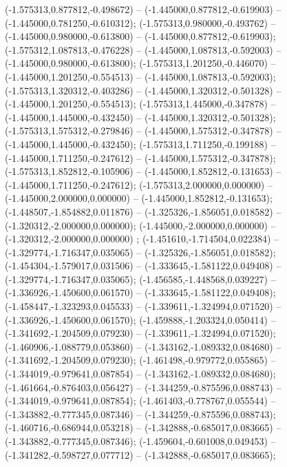  (-1.575313,0.877812,-0.498672) -- (-1.445000,0.877812,-0.619903) -- (-1.445000,0.781250,-0.610312);
 (-1.575313,0.980000,-0.493762) -- (-1.445000,0.980000,-0.613800) -- (-1.445000,0.877812,-0.619903);
 (-1.575312,1.087813,-0.476228) -- (-1.445000,1.087813,-0.592003) -- (-1.445000,0.980000,-0.613800);
 (-1.575313,1.201250,-0.446070) -- (-1.445000,1.201250,-0.554513) -- (-1.445000,1.087813,-0.592003);
 (-1.575313,1.320312,-0.403286) -- (-1.445000,1.320312,-0.501328) -- (-1.445000,1.201250,-0.554513);
 (-1.575313,1.445000,-0.347878) -- (-1.445000,1.445000,-0.432450) -- (-1.445000,1.320312,-0.501328);
 (-1.575313,1.575312,-0.279846) -- (-1.445000,1.575312,-0.347878) -- (-1.445000,1.445000,-0.432450);
 (-1.575313,1.711250,-0.199188) -- (-1.445000,1.711250,-0.247612) -- (-1.445000,1.575312,-0.347878);
 (-1.575313,1.852812,-0.105906) -- (-1.445000,1.852812,-0.131653) -- (-1.445000,1.711250,-0.247612);
 (-1.575313,2.000000,0.000000) -- (-1.445000,2.000000,0.000000) -- (-1.445000,1.852812,-0.131653);
 (-1.448507,-1.854882,0.011876) -- (-1.325326,-1.856051,0.018582) -- (-1.320312,-2.000000,0.000000);
 (-1.445000,-2.000000,0.000000) -- (-1.320312,-2.000000,0.000000) ;
 (-1.451610,-1.714504,0.022384) -- (-1.329774,-1.716347,0.035065) -- (-1.325326,-1.856051,0.018582);
 (-1.454304,-1.579017,0.031506) -- (-1.333645,-1.581122,0.049408) -- (-1.329774,-1.716347,0.035065);
 (-1.456585,-1.448568,0.039227) -- (-1.336926,-1.450600,0.061570) -- (-1.333645,-1.581122,0.049408);
 (-1.458447,-1.323293,0.045533) -- (-1.339611,-1.324994,0.071520) -- (-1.336926,-1.450600,0.061570);
 (-1.459888,-1.203324,0.050414) -- (-1.341692,-1.204509,0.079230) -- (-1.339611,-1.324994,0.071520);
 (-1.460906,-1.088779,0.053860) -- (-1.343162,-1.089332,0.084680) -- (-1.341692,-1.204509,0.079230);
 (-1.461498,-0.979772,0.055865) -- (-1.344019,-0.979641,0.087854) -- (-1.343162,-1.089332,0.084680);
 (-1.461664,-0.876403,0.056427) -- (-1.344259,-0.875596,0.088743) -- (-1.344019,-0.979641,0.087854);
 (-1.461403,-0.778767,0.055544) -- (-1.343882,-0.777345,0.087346) -- (-1.344259,-0.875596,0.088743);
 (-1.460716,-0.686944,0.053218) -- (-1.342888,-0.685017,0.083665) -- (-1.343882,-0.777345,0.087346);
 (-1.459604,-0.601008,0.049453) -- (-1.341282,-0.598727,0.077712) -- (-1.342888,-0.685017,0.083665);
